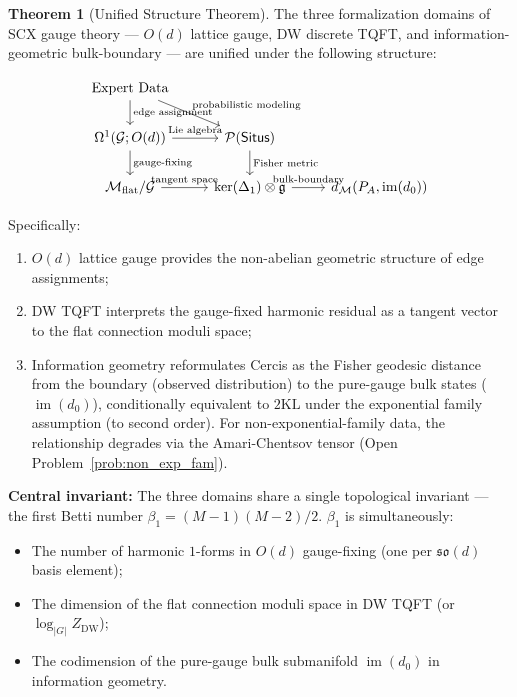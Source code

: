 \documentclass[12pt,a4paper]{article}
\theoremstyle{definition}
\newtheorem{theorem}{Theorem}[section]
\theoremstyle{remark}
\theoremstyle{definition}
\newcommand{\Od}{O(d)}
\newcommand{\grph}{\mathcal{G}}
\newcommand{\Lone}{\Delta_1}
\newcommand{\Situs}{\textsf{Situs}}
\newcommand{\KL}{\mathrm{KL}}
\newcommand{\GeoDist}{d_{\mathcal{M}}}
\newcommand{\DW}{\mathrm{DW}}
\newcommand{\ZBetti}{\beta_1}
\newcommand{\Gflatquot}{\mathcal{M}_{\mathrm{flat}}/\mathcal{G}}
\DeclareMathOperator{\im}{im}
\begin{document}
\begin{theorem}[Unified Structure Theorem]\label{thm:unified}
The three formalization domains of SCX gauge theory — $O(d)$ lattice gauge, DW discrete TQFT, and information-geometric bulk-boundary —
are unified under the following structure:

\[
\begin{tikzcd}
    \text{Expert Data} \arrow[d, "\text{edge assignment}"] \arrow[dr, "\text{probabilistic modeling}"] \\
    \Omega^1(\grph; \Od) \arrow[d, "\text{gauge-fixing}"] \arrow[r, "\text{Lie algebra}"] & \mathcal{P}(\Situs) \arrow[d, "\text{Fisher metric}"] \\
    \Gflatquot \arrow[r, "\text{tangent space}"] & \ker(\Lone) \otimes \mathfrak{g} \arrow[r, "\text{bulk-boundary}"] & \GeoDist(P_A, \im(d_0))
\end{tikzcd}
\]

Specifically:
\begin{enumerate}[label=(\alph*)]
    \item $O(d)$ lattice gauge provides the non-abelian geometric structure of edge assignments;
    \item DW TQFT interprets the gauge-fixed harmonic residual as a tangent vector to the flat connection moduli space;
    \item Information geometry reformulates Cercis as the Fisher geodesic distance from the boundary (observed distribution) to the pure-gauge bulk states ($\im(d_0)$),
    conditionally equivalent to $2\KL$ under the exponential family assumption (to second order). For non-exponential-family data, the relationship degrades via the Amari-Chentsov tensor (Open Problem~\ref{prob:non_exp_fam}).
\end{enumerate}

\textbf{Central invariant:} The three domains share a single topological invariant — the first Betti number $\ZBetti = (M-1)(M-2)/2$.
$\ZBetti$ is simultaneously:
\begin{itemize}
    \item The number of harmonic $1$-forms in $O(d)$ gauge-fixing (one per $\mathfrak{so}(d)$ basis element);
    \item The dimension of the flat connection moduli space in DW TQFT (or $\log_{|G|}Z_{\DW}$);
    \item The codimension of the pure-gauge bulk submanifold $\im(d_0)$ in information geometry.
\end{itemize}
\end{theorem}
\end{document}
